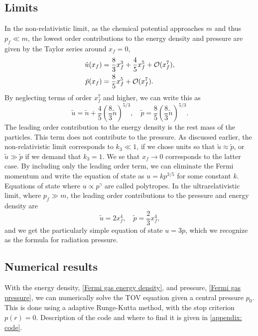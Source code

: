 \subsection{Limits}

In the non-relativistic limit, as the chemical potential approaches $m$ and thus $p_f \ll m$, the lowest order contributions to the energy density and pressure are given by the Taylor series around $x_f = 0$,
%
\begin{align}
    \tilde u(x_f) &= \frac{8}{3}x_f^3 + \frac{4}{5} x_f^5 + \mathcal O(x_f^7),  \\
    \tilde p(x_f) &= \frac{8}{5}x_f^5 + \mathcal O(x_f^7).
\end{align}
%
By neglecting terms of order $x_f^7$ and higher, we can write this as
%
\begin{equation}
    \tilde u = \tilde n + \frac{4}{5} \left( \frac{8}{3} \tilde n \right)^{5/3},
    \quad
    \tilde p =  \frac{8}{5} \left( \frac{8}{3} \tilde n \right)^{5/3}.
\end{equation}
%
The leading order contribution to the energy density is the rest mass of the particles.
This term does not contribute to the pressure.
As discussed earlier, the non-relativistic limit corresponds to $k_3 \ll 1$, if we chose units so that $\tilde u \approx \tilde p$, or $\tilde u \gg \tilde p$ if we demand that $k_3 = 1$.
We se that $x_f \rightarrow 0$ corresponds to the latter case.
By including only the leading order term, we can eliminate the Fermi momentum and write the equation of state as $u = k p^{3/5}$ for some constant $k$.
Equations of state where $u \propto p^{\gamma}$ are called polytropes.
In the ultrarelativistic limit, where $p_f \gg m$, the leading order contributions to the pressure and energy density are
%
\begin{equation}
    \tilde u = 2 x_f^4, \quad \tilde p = \frac{2}{3} x_f^4, 
\end{equation}
%
and we get the particularly simple equation of state $ u = 3 p $, which we recognize as the formula for radiation pressure.


\subsection{Numerical results}

With the energy density, \autoref{Fermi gas energy density}, and pressure, \autoref{Fermi gas pressure}, we can numerically solve the TOV equation given a central pressure $p_0$. 
This is done using a adaptive Runge-Kutta method, with the stop criterion $p(r) = 0$.
Description of the code and where to find it is given in \autoref{appendix: code}.

